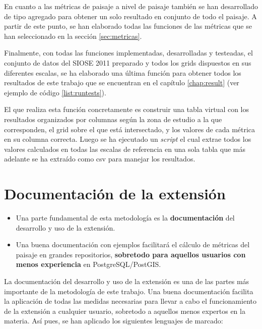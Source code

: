 \label{list:tca3}

En cuanto a las métricas de paisaje a nivel de paisaje también se han desarrollado de tipo agregado para obtener un solo resultado en conjunto de todo el paisaje. A partir de este punto, se han elaborado todas las funciones de las métricas que se han seleccionado en la sección \ref{sec:metricas}.

Finalmente, con todas las funciones implementadas, desarrolladas y testeadas, el conjunto de datos del SIOSE 2011 preparado y todos los grids dispuestos en sus diferentes escalas, se ha elaborado una última función para obtener todos los resultados de este trabajo que se encuentran en el capítulo \ref{chap:result} (ver ejemplo de código \ref{list:runtests}).

\label{list:runtests}

El que realiza esta función concretamente es construir una tabla virtual con los resultados organizados por columnas según la zona de estudio a la que corresponden, el grid sobre el que está intersectado, y los valores de cada métrica en su columna correcta. Luego se ha ejecutado un \textit{script} el cual extrae todos los valores calculados en todas las escalas de referencia en una sola tabla que más adelante se ha extraído como csv para manejar los resultados.


\section{Documentación de la extensión}

\begin{graybox}
\begin{itemize}
\item Una parte fundamental de esta metodología es la \textbf{documentación} del desarrollo y uso de la extensión. 
\item Una buena documentación con ejemplos facilitará el cálculo de métricas del paisaje en grandes repositorios, \textbf{sobretodo para aquellos usuarios con menos experiencia} en PostgreSQL/PostGIS.
\end{itemize}
\end{graybox}

La documentación del desarrollo y uso de la extensión es una de las partes más importante de la metodología de este trabajo. Una buena documentación facilita la aplicación de todas las medidas necesarias para llevar a cabo el funcionamiento de la extensión a cualquier usuario, sobretodo a aquellos menos expertos en la materia. Así pues, se han aplicado los siguientes lenguajes de marcado:

